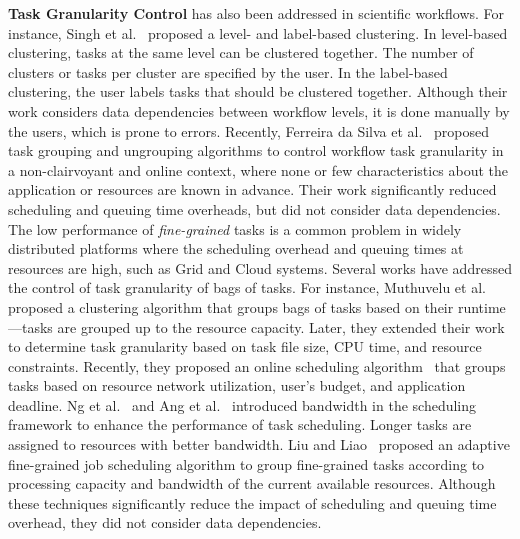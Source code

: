 \textbf{Task Granularity Control} has also been addressed in scientific workflows. For instance, Singh et al.~\cite{Singh2008} proposed a level- and label-based clustering. In level-based clustering, tasks at the same level can be clustered together. The number of clusters or tasks per cluster are specified by the user. In the label-based clustering, the user labels tasks that should be clustered together. Although their work considers data dependencies between workflow levels, it is done manually by the users, which is prone to errors. Recently, Ferreira da Silva et al.~\cite{Ferreira-granularity-2013} proposed task grouping and ungrouping algorithms to control workflow task granularity in a non-clairvoyant and online context, where none or few characteristics about the application or resources are known in advance. Their work significantly reduced scheduling and queuing time overheads, but did not consider data dependencies. The low performance of \emph{fine-grained} tasks is a common problem in widely distributed platforms where the scheduling overhead and queuing times at resources are high, such as Grid and Cloud systems. Several works have addressed the control of task granularity of bags of tasks. For instance, Muthuvelu et al.~\cite{Muthuvelu2005} proposed a clustering algorithm that groups bags of tasks based on their runtime---tasks are grouped up to the resource capacity. Later, they extended their work~\cite{4493929} to determine task granularity based on task file size, CPU time, and resource constraints. Recently, they proposed an online scheduling algorithm~\cite{Muthuvelu2010,Muthuvelu2013} that groups tasks based on resource network utilization, user's budget, and application deadline. Ng et al.~\cite{Keat2006} and Ang et al.~\cite{Ang2009} introduced bandwidth in the scheduling framework to enhance the performance of task scheduling. Longer tasks are assigned to resources with better bandwidth. Liu and Liao~\cite{Liu2009} proposed an adaptive fine-grained job scheduling algorithm to group fine-grained tasks according to processing capacity and bandwidth of the current available resources. Although these techniques significantly reduce the impact of scheduling and queuing time overhead, they did not consider data dependencies.


